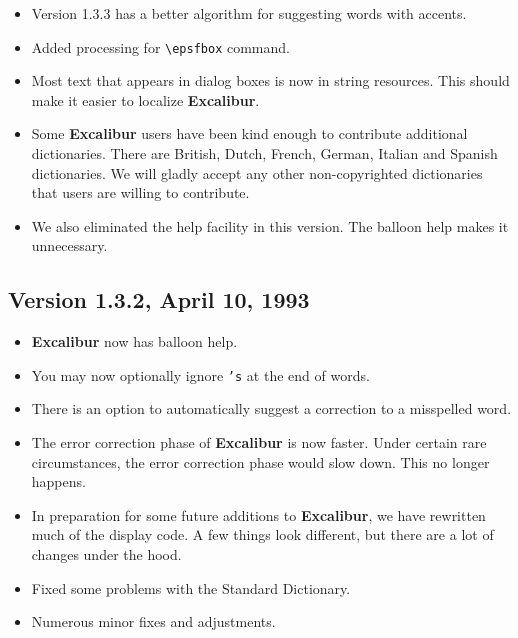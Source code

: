 ﻿\documentclass[11pt,titlepage]{article}
\newcommand{\ex}{\textbf{Excalibur}}
\begin{document}
\begin{itemize}

\item Version 1.3.3 has a better algorithm for suggesting words with
  accents.

\item Added processing for \verb+\epsfbox+ command.

\item Most text that appears in dialog boxes is now in string
  resources. This should make it easier to localize \ex.

\item Some \ex{} users have been kind enough to contribute additional
  dictionaries. There are British, Dutch, French, German, Italian and
  Spanish dictionaries.  We will gladly accept any other
  non-copyrighted dictionaries that users are willing to contribute.

\item We also eliminated the help facility in this version. The
  balloon help makes it unnecessary.

\end{itemize}

\subsection{Version 1.3.2, April 10, 1993}

\begin{itemize}
\item \ex{} now has balloon help.

\item You may now optionally ignore \texttt{'s} at the end of words.

\item There is an option to automatically suggest a correction to a
  misspelled word.

\item The error correction phase of \ex{} is now faster. Under certain
  rare circumstances, the error correction phase would slow down. This
  no longer happens.

\item In preparation for some future additions to \ex{}, we have
  rewritten much of the display code. A few things look different, but
  there are a lot of changes under the hood.

\item Fixed some problems with the Standard Dictionary.

\item Numerous minor fixes and adjustments.
\end{itemize}
\end{document}
